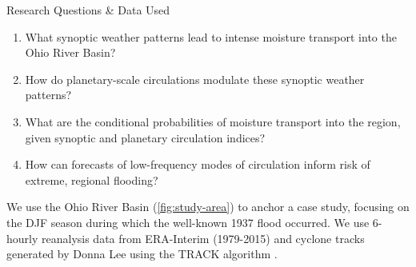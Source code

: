 \begin{block}{Research Questions \& Data Used}
    \begin{enumerate}
        \item What synoptic weather patterns lead to intense moisture transport into the Ohio River Basin?
        \item How do planetary-scale circulations modulate these synoptic weather patterns?
        \item What are the conditional probabilities of moisture transport into the region, given synoptic and planetary circulation indices?
        \item How can forecasts of low-frequency modes of circulation inform risk of extreme, regional flooding?
    \end{enumerate}
    We use the Ohio River Basin (\cref{fig:study-area}) to anchor a case study, focusing on the DJF season during which the well-known 1937 flood occurred.
    We use 6-hourly reanalysis data from ERA-Interim \cite{Dee2011} (1979-2015) and cyclone tracks generated by Donna Lee \cite{Booth2015} using the TRACK algorithm \cite{Hodges1994}.
\end{block}

